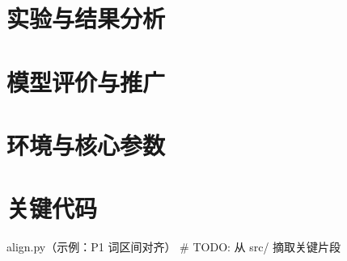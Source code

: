 \documentclass[colorprint]{gmcmthesis}
\begin{document}
\section{实验与结果分析}

\section{模型评价与推广}




\appendix
\section{环境与核心参数}

\section{关键代码}
\begin{Python}{align.py（示例：P1 词区间对齐）}
# TODO: 从 src/ 摘取关键片段
\end{Python}
\end{document}

